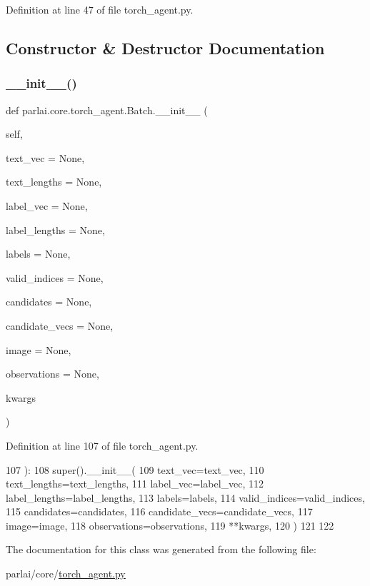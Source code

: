 Definition at line 47 of file torch\+\_\+agent.\+py.



\subsection{Constructor \& Destructor Documentation}
\mbox{\label{classparlai_1_1core_1_1torch__agent_1_1Batch_a6ef9b406e741e455da515aa8f84c798e}} 
\subsubsection{\texorpdfstring{\+\_\+\+\_\+init\+\_\+\+\_\+()}{\_\_init\_\_()}}
{\footnotesize\ttfamily def parlai.\+core.\+torch\+\_\+agent.\+Batch.\+\_\+\+\_\+init\+\_\+\+\_\+ (\begin{DoxyParamCaption}\item[{}]{self,  }\item[{}]{text\+\_\+vec = {\ttfamily None},  }\item[{}]{text\+\_\+lengths = {\ttfamily None},  }\item[{}]{label\+\_\+vec = {\ttfamily None},  }\item[{}]{label\+\_\+lengths = {\ttfamily None},  }\item[{}]{labels = {\ttfamily None},  }\item[{}]{valid\+\_\+indices = {\ttfamily None},  }\item[{}]{candidates = {\ttfamily None},  }\item[{}]{candidate\+\_\+vecs = {\ttfamily None},  }\item[{}]{image = {\ttfamily None},  }\item[{}]{observations = {\ttfamily None},  }\item[{}]{kwargs }\end{DoxyParamCaption})}



Definition at line 107 of file torch\+\_\+agent.\+py.


\begin{DoxyCode}
107     ):
108         super().\_\_init\_\_(
109             text\_vec=text\_vec,
110             text\_lengths=text\_lengths,
111             label\_vec=label\_vec,
112             label\_lengths=label\_lengths,
113             labels=labels,
114             valid\_indices=valid\_indices,
115             candidates=candidates,
116             candidate\_vecs=candidate\_vecs,
117             image=image,
118             observations=observations,
119             **kwargs,
120         )
121 
122 
\end{DoxyCode}


The documentation for this class was generated from the following file\+:\begin{DoxyCompactItemize}
\item 
parlai/core/\hyperlink{torch__agent_8py}{torch\+\_\+agent.\+py}\end{DoxyCompactItemize}
